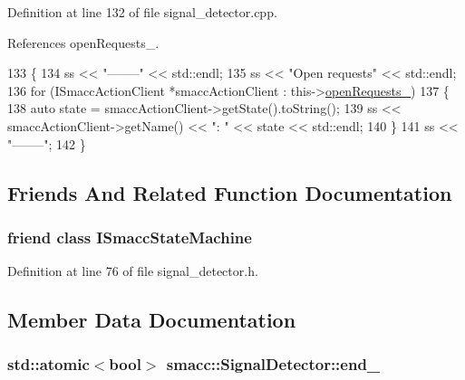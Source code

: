 Definition at line 132 of file signal\+\_\+detector.\+cpp.



References open\+Requests\+\_\+.


\begin{DoxyCode}
133 \{
134     ss << \textcolor{stringliteral}{"--------"} << std::endl;
135     ss << \textcolor{stringliteral}{"Open requests"} << std::endl;
136     \textcolor{keywordflow}{for} (ISmaccActionClient *smaccActionClient : this->\hyperlink{classsmacc_1_1SignalDetector_a3f7e46b9fa9fcac9f5bc72a95ab20ca9}{openRequests\_})
137     \{
138         \textcolor{keyword}{auto} state = smaccActionClient->getState().toString();
139         ss << smaccActionClient->getName() << \textcolor{stringliteral}{": "} << state << std::endl;
140     \}
141     ss << \textcolor{stringliteral}{"--------"};
142 \}
\end{DoxyCode}


\subsection{Friends And Related Function Documentation}
\subsubsection[{\texorpdfstring{I\+Smacc\+State\+Machine}{ISmaccStateMachine}}]{\setlength{\rightskip}{0pt plus 5cm}friend class {\bf I\+Smacc\+State\+Machine}\hspace{0.3cm}{\ttfamily [friend]}}\hypertarget{classsmacc_1_1SignalDetector_a0e71d23a61c07d55f419d02237d03b6a}{}\label{classsmacc_1_1SignalDetector_a0e71d23a61c07d55f419d02237d03b6a}


Definition at line 76 of file signal\+\_\+detector.\+h.



\subsection{Member Data Documentation}
\subsubsection[{\texorpdfstring{end\+\_\+}{end_}}]{\setlength{\rightskip}{0pt plus 5cm}std\+::atomic$<${\bf bool}$>$ smacc\+::\+Signal\+Detector\+::end\+\_\+\hspace{0.3cm}{\ttfamily [private]}}\hypertarget{classsmacc_1_1SignalDetector_aaee266393c01693528a2d74b1f2354a2}{}\label{classsmacc_1_1SignalDetector_aaee266393c01693528a2d74b1f2354a2}


